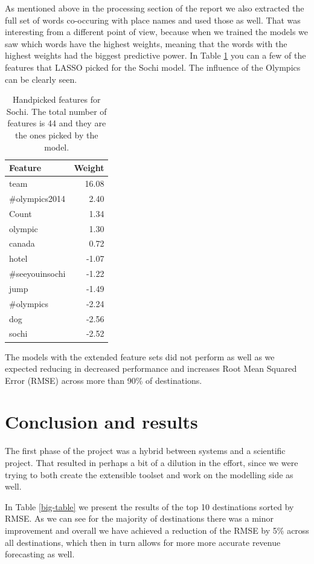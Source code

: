 \documentclass[minf,twoside,singlespacing,parskip,notimes,deptreport]{infthesis} %
\begin{document}
As mentioned above in the processing section of the report we also extracted the full set of words co-occuring with place names and used those as well. That was interesting from a different point of view, because when we trained the models we saw which words have the highest weights, meaning that the words with the highest weights had the biggest predictive power. In Table \ref{tab:sochi-table} you can a few of the features that LASSO picked for the Sochi model. The influence of the Olympics can be clearly seen. 


\begin{table}[]
\begin{center}
\begin{tabular}{l | r}
Feature & Weight\\
\hline
team & 16.08\\
\#olympics2014 & 2.40\\
Count & 1.34\\
olympic & 1.30\\
canada & 0.72\\
hotel & -1.07\\
\#seeyouinsochi & -1.22\\
jump & -1.49\\
\#olympics & -2.24\\
dog & -2.56\\
sochi & -2.52\\
\end{tabular}
\end{center}
\caption{Handpicked features for Sochi. The total number of features is 44 and they are the ones picked by the model. } 
\label{tab:sochi-table}
\end{table}

The models with the extended feature sets did not perform as well as we expected reducing in decreased performance and increases Root Mean Squared Error (RMSE) across more than 90\% of destinations.


\section{Conclusion and results}


The first phase of the project was a hybrid between systems and a scientific project. That resulted in perhaps a bit of a dilution in the effort, since we were trying to both create the extensible toolset and work on the modelling side as well. 

In Table \ref{big-table} we present the results of the top 10 destinations sorted by RMSE. As we can see for the majority of destinations there was a minor improvement and overall we have achieved a reduction of the RMSE by 5\% across all destinations, which then in turn allows for more more accurate revenue forecasting as well. 
\end{document}
